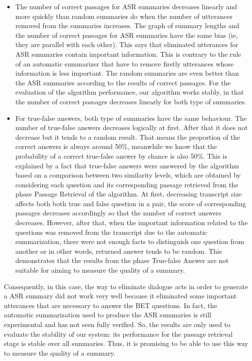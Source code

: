 \begin{itemize}
\item {The number of correct passages for ASR summaries decreases linearly and more quickly than random summaries do when the number of utterances removed from the summaries increases. The graph of summary lengths and the number of correct passages for ASR summaries have the same bias (ie, they are parallel with each other). This says that eliminated utterances for ASR summaries contain important information. This is contrary to the rule of an automatic summarizer that have to remove firstly utterances whose information is less important. The random summaries are even better than the ASR summaries according to the results of correct passages. For the evaluation of the algorithm performance, our algorithm works stably, in that the number of correct passages decreases linearly for both type of summaries. }
\item {For true-false answers, both type of summaries have the same behaviour. The number of true-false answers decreases logically at first. After that it does not decrease but it tends to a random result. That means the proportion of the correct answers is always around 50\%, meanwhile we know that the probability of a correct true-false answer by chance is also 50\%. This is explained by a fact that true-false answers were answered by the algorithm based on a comparison between two similarity levels, which are obtained by considering each question and its corresponding passage retrieved from the phase Passage Retrieval of the algorithm. At first, decreasing transcript size affects both both true and false question in a pair, the score of corresponding passages decreases accordingly so that the number of correct answers decreases. However, after that, when the important information related to the questions was removed from the transcript due to the automatic summarization, there were not enough facts to distinguish one question from another or in other words, returned answer tends to be random. This demonstrates that the results from the phase True-false Answer are not suitable for aiming to measure the quality of a summary.}

\end{itemize}

Consequently, in this case, the way to eliminate dialogue acts in order to generate a ASR summary did not work very well because it eliminated some important utterances that are necessary to answer the BET questions. In fact, the automatic summarization used to produce the ASR summaries is still experimental and has not seen fully verified. So, the results are only used to evaluate the stability of our system: its performance for the passage retrieval stage is stable over all summaries. Thus, it is promising to be able to use this way to measure the quality of a summary. 




